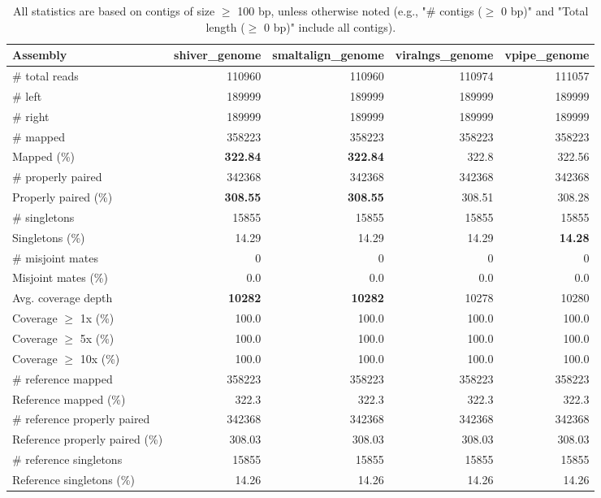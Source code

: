 \documentclass[12pt,a4paper]{article}
\begin{document}
\begin{table}[ht]
\begin{center}
\caption{All statistics are based on contigs of size $\geq$ 100 bp, unless otherwise noted (e.g., "\# contigs ($\geq$ 0 bp)" and "Total length ($\geq$ 0 bp)" include all contigs).}
\begin{tabular}{|l*{4}{|r}|}
\hline
Assembly & shiver\_genome & smaltalign\_genome & viralngs\_genome & vpipe\_genome \\ \hline
\# total reads & 110960 & 110960 & 110974 & 111057 \\ \hline
\# left & 189999 & 189999 & 189999 & 189999 \\ \hline
\# right & 189999 & 189999 & 189999 & 189999 \\ \hline
\# mapped & 358223 & 358223 & 358223 & 358223 \\ \hline
Mapped (\%) & {\bf 322.84} & {\bf 322.84} & 322.8 & 322.56 \\ \hline
\# properly paired & 342368 & 342368 & 342368 & 342368 \\ \hline
Properly paired (\%) & {\bf 308.55} & {\bf 308.55} & 308.51 & 308.28 \\ \hline
\# singletons & 15855 & 15855 & 15855 & 15855 \\ \hline
Singletons (\%) & 14.29 & 14.29 & 14.29 & {\bf 14.28} \\ \hline
\# misjoint mates & 0 & 0 & 0 & 0 \\ \hline
Misjoint mates (\%) & 0.0 & 0.0 & 0.0 & 0.0 \\ \hline
Avg. coverage depth & {\bf 10282} & {\bf 10282} & 10278 & 10280 \\ \hline
Coverage $\geq$ 1x (\%) & 100.0 & 100.0 & 100.0 & 100.0 \\ \hline
Coverage $\geq$ 5x (\%) & 100.0 & 100.0 & 100.0 & 100.0 \\ \hline
Coverage $\geq$ 10x (\%) & 100.0 & 100.0 & 100.0 & 100.0 \\ \hline
\# reference mapped & 358223 & 358223 & 358223 & 358223 \\ \hline
Reference mapped (\%) & 322.3 & 322.3 & 322.3 & 322.3 \\ \hline
\# reference properly paired & 342368 & 342368 & 342368 & 342368 \\ \hline
Reference properly paired (\%) & 308.03 & 308.03 & 308.03 & 308.03 \\ \hline
\# reference singletons & 15855 & 15855 & 15855 & 15855 \\ \hline
Reference singletons (\%) & 14.26 & 14.26 & 14.26 & 14.26 \\ \hline

\end{tabular}
\end{center}
\end{table}
\end{document}
